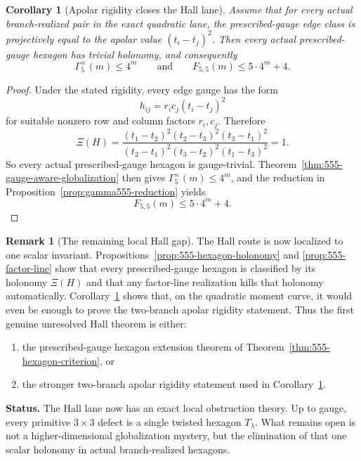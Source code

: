 \documentclass[11pt]{article}
\newtheorem{corollary}[theorem]{Corollary}
\theoremstyle{definition}
\newtheorem{remark}[theorem]{Remark}
\newcommand{\1}{\mathbf{1}}
\newcommand{\status}[1]{\par\smallskip\noindent\textbf{Status.} #1\par\smallskip}
\begin{document}
\begin{corollary}[Apolar rigidity closes the Hall lane]\label{cor:555-apolar-rigidity}
Assume that for every actual branch-realized pair in the exact quadratic lane, the prescribed-gauge edge class is projectively equal to the apolar value $(t_i-t_j)^2$. Then every actual prescribed-gauge hexagon has trivial holonomy, and consequently
\[
\Gamma_5^\times(m)\le 4^m
\qquad\text{and}\qquad
F_{5,5}(m)\le 5\cdot 4^m+4.
\]
\end{corollary}

\begin{proof}
Under the stated rigidity, every edge gauge has the form
\[
h_{ij}=r_i c_j (t_i-t_j)^2
\]
for suitable nonzero row and column factors $r_i,c_j$. Therefore
\[
\Xi(H)
=
\frac{(t_1-t_2)^2(t_2-t_3)^2(t_3-t_1)^2}
{(t_2-t_1)^2(t_3-t_2)^2(t_1-t_3)^2}
=1.
\]
So every actual prescribed-gauge hexagon is gauge-trivial. Theorem~\ref{thm:555-gauge-aware-globalization} then gives $\Gamma_5^\times(m)\le 4^m$, and the reduction in Proposition~\ref{prop:gamma555-reduction} yields
\[
F_{5,5}(m)\le 5\cdot 4^m+4.
\]
\end{proof}

\begin{remark}[The remaining local Hall gap]\label{rem:555-hexagon-gap}
The Hall route is now localized to one scalar invariant. Propositions~\ref{prop:555-hexagon-holonomy} and \ref{prop:555-factor-line} show that every prescribed-gauge hexagon is classified by its holonomy $\Xi(H)$ and that any factor-line realization kills that holonomy automatically. Corollary~\ref{cor:555-apolar-rigidity} shows that, on the quadratic moment curve, it would even be enough to prove the two-branch apolar rigidity statement. Thus the first genuine unresolved Hall theorem is either:
\begin{enumerate}[label=(\roman*),leftmargin=2.2em]
\item the prescribed-gauge hexagon extension theorem of Theorem~\ref{thm:555-hexagon-criterion}, or
\item the stronger two-branch apolar rigidity statement used in Corollary~\ref{cor:555-apolar-rigidity}.
\end{enumerate}
\end{remark}

\status{The Hall lane now has an exact local obstruction theory. Up to gauge, every primitive $3\times 3$ defect is a single twisted hexagon $T_\lambda$. What remains open is not a higher-dimensional globalization mystery, but the elimination of that one scalar holonomy in actual branch-realized hexagons.}
\end{document}
